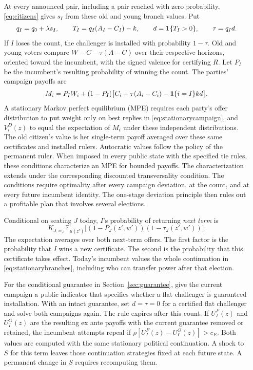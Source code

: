 \documentclass[11pt,letterpaper]{article}
\newcommand{\E}{\mathbb E}
\begin{document}
At every announced pair, including a pair reached with zero probability, \eqref{eq:citizens} gives $s_I$ from these old and young branch values. Put
\[
 q_I=q_0+\lambda s_I,\qquad T_I=q_I(A_I-C_I)-k,\qquad
 d={\bf1}\{T_I>0\},\qquad \tau=q_I d .
\]
If $I$ loses the count, the challenger is installed with probability $1-\tau$. Old and young voters compare $W-C-\tau(A-C)$ over their respective horizons, oriented toward the incumbent, with the signed valence for certifying $R$. Let $P_I$ be the incumbent's resulting probability of winning the count. The parties' campaign payoffs are
\begin{equation}
 M_i=P_IW_i+(1-P_I)
 \big[C_i+\tau(A_i-C_i)-{\bf1}\{i=I\}k d\big] .
 \label{eq:stationarycampaign}
\end{equation}
A stationary Markov perfect equilibrium (MPE) requires each party's offer distribution to put weight only on best replies in \eqref{eq:stationarycampaign}, and $V_i^D(z)$ to equal the expectation of $M_i$ under these independent distributions. The old citizen's value is her single-term payoff averaged over these same certificates and installed rulers. Autocratic values follow the policy of the permanent ruler. When imposed in every public state with the specified tie rules, these conditions characterize an MPE for bounded payoffs. The characterization extends under the corresponding discounted transversality condition. The conditions require optimality after every campaign deviation, at the count, and at every future incumbent identity. The one-stage deviation principle then rules out a profitable plan that involves several elections.

Conditional on seating $J$ today, $I$'s probability of returning \emph{next term} is
\[
 K_{J,w_J}\,\E_{\mu(z')}\big[(1-P_J(z',w'))(1-\tau_J(z',w'))\big].
\]
The expectation averages over both next-term offers. The first factor is the probability that $I$ wins a new certificate. The second is the probability that this certificate takes effect. Today's incumbent values the whole continuation in \eqref{eq:stationarybranches}, including who can transfer power after that election.

For the conditional guarantee in Section~\ref{sec:guarantee}, give the current campaign a public indicator that specifies whether a flat challenger is guaranteed installation. With an intact guarantee, set $d=\tau=0$ for a certified flat challenger and solve both campaigns again. The rule expires after this count. If $U_I^F(z)$ and $U_I^G(z)$ are the resulting ex ante payoffs with the current guarantee removed or retained, the incumbent attempts repeal if $\rho[U_I^F(z)-U_I^G(z)]>c_E$. Both values are computed with the same stationary political continuation. A shock to $S$ for this term leaves those continuation strategies fixed at each future state. A permanent change in $S$ requires recomputing them.
\end{document}
